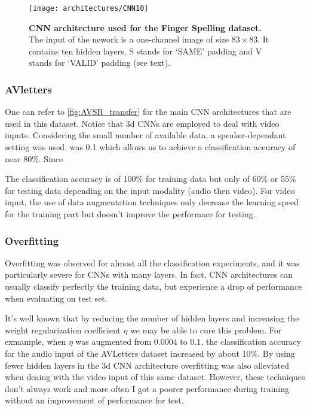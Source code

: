 \begin{figure}[H]
  \centering
  \texttt{[image: architectures/CNN10]}
  \caption{%
    \textbf{CNN architecture used for the Finger Spelling  dataset.}
      \\[0.1em]
    The input of the nework is a one-channel image of size $83 \times 83$.
      It contains ten hidden layers. S stands for `SAME' padding
      and V stands for `VALID' padding (see text).}
  \label{fig:CNN10}
\end{figure}

\subsubsection{AVletters}

One can refer to \autoref{fig:AVSR_transfer} for the main CNN architectures
that are used in this dataset. 
Notice that 3d CNNs are employed to deal with video inputs.
Considering the small number of available data, a speaker-dependant
setting was used.
was 0.1 which allows us to achieve a classification accuracy of near 80\%.
Since 

The classification accuracy is of 100\% for training data but only
of 60\% or 55\% for testing data depending on the input modality
(audio then video).
For video input, the use of data augmentation techniques only decrease
the learning speed for the training part but doesn't improve the performace
for testing.

\subsubsection{Overfitting}

Overfitting was observed for almost all the classification
experiments, and it was particularly severe for
CNNs with many layers.
In fact, CNN architectures can usually classify
perfectly the training data, but experience a drop of performance
when evaluating on test set.

It's well known that by reducing the number of hidden layers and
increasing the weight regularization coefficient $\eta$ we may
be able to cure this problem.
For exmample, when $\eta$ was augmented from $0.0004$ to $0.1$,
the classification accuracy for the audio input of the AVLetters
dataset increased by about 10\%.
By using fewer hidden layers in the 3d CNN architecture overfitting
was also alleviated when deaing with the video input of this same dataset.
However, these techniques don't always work
and more often I got a poorer performance during training without
an improvement of performance for test.

